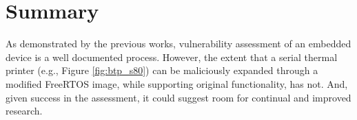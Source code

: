 \section{Summary} \label{introductionsummary}

As demonstrated by the previous works, vulnerability assessment of an embedded device is a well documented process. However, the extent that a serial thermal printer (e.g., Figure \ref{fig:btp_s80}) can be maliciously expanded through a modified FreeRTOS image, while supporting original functionality, has not. And, given success in the assessment, it could suggest room for continual and improved research.